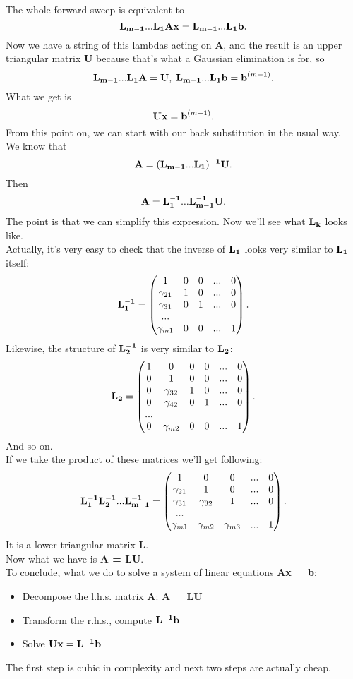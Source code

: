 \documentclass{article}
\begin{document}
The whole forward sweep is equivalent to
\[
    {\bf L_{m-1}}...{\bf L_1}{\bf Ax} = {\bf L_{m-1}}...{\bf L_1b}.
\]
Now we have a string of this lambdas acting on {\bf A}, and the result is an upper triangular matrix {\bf U} because that's what a Gaussian elimination is for, so 
\[
{\bf L_{m-1}...L_1A = U}, \; {\bf L_{m-1}...L_1b = b}^{(m-1)}.
\]
What we get is
\[
    {\bf Ux=b}^{(m-1)}.
\]
From this point on, we can start with our back substitution in the usual way.\\
We know that
\[
{\bf A = (L_{m-1}...L_1)^{-1}U}.
\]
Then
\[
    {\bf A = L_1^{-1}...L_{m-1}^{-1}U}.
\]
The point is that we can simplify this expression. Now we'll see what ${\bf L_k}$ looks like.\\
Actually, it's very easy to check that the inverse of ${\bf L_1}$ looks very similar to ${\bf L_1}$ itself:
\[
{\bf L_1^{-1}} = 
\begin{pmatrix}
    1 & 0 & 0 & ... & 0\\
    \gamma_{21} & 1 & 0 & ... & 0\\
    \gamma_{31} & 0 & 1 & ... & 0\\
    ...\\
    \gamma_{m1} & 0 & 0 & ... & 1
\end{pmatrix}.
\]
Likewise, the structure of ${\bf L_2^{-1}}$ is very similar to ${\bf L_2}$:
\[
{\bf L_2} = 
\begin{pmatrix}
    1 & 0 & 0 & 0 & ... & 0\\
    0 & 1 & 0 & 0 & ... & 0\\
    0 & \gamma_{32} & 1 & 0 & ... & 0\\
    0 & \gamma_{42} & 0 & 1 & ... & 0\\
    ...\\
    0 & \gamma_{m2} & 0 & 0 & ... & 1
\end{pmatrix}.
\]
And so on.\\
If we take the product of these matrices we'll get following:
\[
{\bf L_1^{-1}L_2^{-1}...L_{m-1}^{-1}} = 
\begin{pmatrix}
    1 & 0 & 0 & ... & 0\\
    \gamma_{21} & 1 & 0 & ... & 0\\
    \gamma_{31} & \gamma_{32} & 1 & ... & 0\\
    ...\\
    \gamma_{m1} & \gamma_{m2} & \gamma_{m3} & ... & 1
\end{pmatrix}.
\]
It is a lower triangular matrix {\bf L}.\\
Now what we have is {\bf A = LU}.\\
To conclude, what we do to solve a system of linear equations {\bf Ax = b}:
\begin{itemize}
    \item Decompose the l.h.s. matrix {\bf A}: {\bf A = LU}
    \item Transform the r.h.s., compute ${\bf L^{-1}b}$
    \item Solve ${\bf Ux = L^{-1}b}$
\end{itemize}
The first step is cubic in complexity and next two steps are actually cheap.
\end{document}
